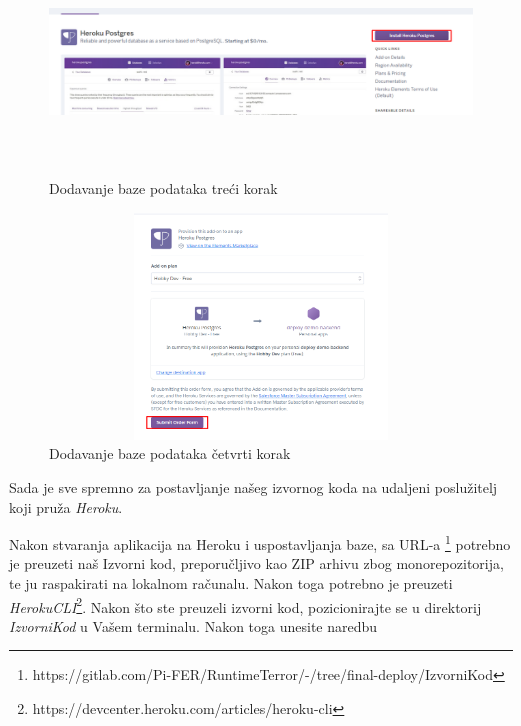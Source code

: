 			\begin{figure}[H]
				\includegraphics[width=130mm, height=60mm]{slike/heroku-insaddon.png} %
				\centering
				\caption{Dodavanje baze podataka treći korak}
				\label{fig:dijagramdeployment}
			\end{figure}
			\begin{figure}[H]
				\includegraphics[width=130mm, height=60mm]{slike/heroku-submit.png} %
				\centering
				\caption{Dodavanje baze podataka četvrti korak}
				\label{fig:dijagramdeployment}
			\end{figure}
			
			Sada je sve spremno za postavljanje našeg izvornog koda na udaljeni poslužitelj koji pruža \textit{Heroku}.
			
			Nakon stvaranja aplikacija na Heroku i uspostavljanja baze, sa URL-a \footnote{https://gitlab.com/Pi-FER/RuntimeTerror/-/tree/final-deploy/IzvorniKod} potrebno je preuzeti naš Izvorni kod, preporučljivo kao ZIP arhivu zbog monorepozitorija, te ju raspakirati na lokalnom računalu. Nakon toga potrebno je preuzeti \textit{HerokuCLI}\footnote{https://devcenter.heroku.com/articles/heroku-cli}.
			Nakon što ste preuzeli izvorni kod, pozicionirajte se u direktorij \textit{IzvorniKod} u Vašem terminalu.
			Nakon toga unesite naredbu 
			

